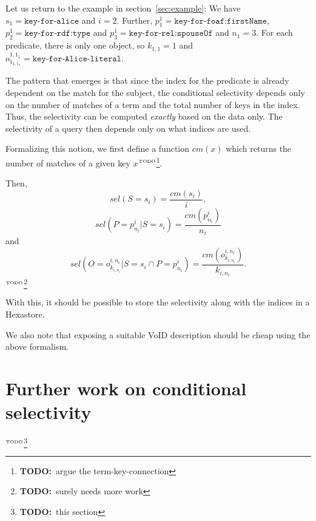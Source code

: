 \documentclass[12pt, draft]{article}
\newcommand{\todo}[1]{\ensuremath{^{\textrm{\tiny{TODO}\normalsize}}}\footnote{\textbf{TODO:}~#1}}
\newcommand{\sel}[1]{\ensuremath{sel\left(#1\right)}}
\begin{document}
Let us return to the example in section~\ref{sec:example}: We have
$s_1 = \texttt{key-for-alice}$ and $i=2$. Further, $p_1^1 =
\texttt{key-for-foaf:firstName}$, $p_2^1 = \texttt{key-for-rdf:type}$ and $p_3^1 =
\texttt{key-for-rel:spouseOf}$ and $n_1 = 3$. For each predicate, there is only
one object, so $k_{1,1} = 1$ and $o_{1_{1,1_1}}^{1,1_1} = \texttt{key-for-Alice-literal}$.

The pattern that emerges is that since the index for the predicate is
already dependent on the match for the subject, the conditional
selectivity depends only on the number of matches of a term and the
total number of keys in the index. Thus, the selectivity can be
computed \emph{exactly} based on the data only. The selectivity of a
query then depends only on what indices are used. 

Formalizing this notion, we first define a function $cm(x)$ which
returns the number of matches of a given key $x$\todo{argue the
  term-key-connection}. 

Then, 
\begin{equation}
\sel{S = s_i} = \frac{cm(s_i)}{i} ,
\end{equation}
\begin{equation}
\sel{P = p_{n_i}^i|S = s_i} = \frac{cm(p_{n_i}^i)}{n_i}
\end{equation}
and
\begin{equation}
\sel{O = o_{k_{i,n_i}}^{i,n_i} |S = s_i \cap P = p_{n_i}^i} =
\frac{cm(o_{k_{i,n_i}}^{i,n_i})}{k_{i,n_i}} .
\end{equation}
\todo{surely needs more work}

With this, it should be possible to store the selectivity along with
the indices in a Hexastore.

We also note that exposing a suitable VoID description should be cheap
using the above formalism.

\section{Further work on conditional selectivity}

\todo{this section}



\end{document}
